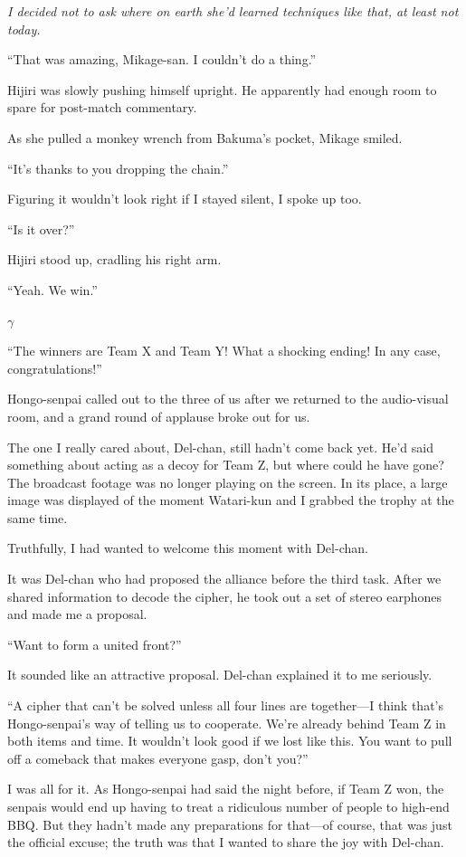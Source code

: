 \documentclass[
    a4paper,
    12pt,
    twoside,
    openany,
    UTF8,
    fontset=windows
]{ctexbook}
\begin{document}
\textit{I decided not to ask where on earth she'd learned techniques like that, at least not today.}

``That was amazing, Mikage-san. I couldn't do a thing.''

Hijiri was slowly pushing himself upright. He apparently had enough room to spare for post-match commentary.

As she pulled a monkey wrench from Bakuma's pocket, Mikage smiled.

``It's thanks to you dropping the chain.''

Figuring it wouldn't look right if I stayed silent, I spoke up too.

``Is it over?''

Hijiri stood up, cradling his right arm.

``Yeah. We win.''

$\gamma$

``The winners are Team X and Team Y! What a shocking ending! In any case, congratulations!''

Hongo-senpai called out to the three of us after we returned to the audio-visual room, and a grand round of applause broke out for us.

The one I really cared about, Del-chan, still hadn't come back yet. He'd said something about acting as a decoy for Team Z, but where could he have gone? The broadcast footage was no longer playing on the screen. In its place, a large image was displayed of the moment Watari-kun and I grabbed the trophy at the same time.

Truthfully, I had wanted to welcome this moment with Del-chan.

It was Del-chan who had proposed the alliance before the third task. After we shared information to decode the cipher, he took out a set of stereo earphones and made me a proposal.

``Want to form a united front?''

It sounded like an attractive proposal. Del-chan explained it to me seriously.

``A cipher that can't be solved unless all four lines are together---I think that's Hongo-senpai's way of telling us to cooperate. We're already behind Team Z in both items and time. It wouldn't look good if we lost like this. You want to pull off a comeback that makes everyone gasp, don't you?''

I was all for it. As Hongo-senpai had said the night before, if Team Z won, the senpais would end up having to treat a ridiculous number of people to high-end BBQ. But they hadn't made any preparations for that---of course, that was just the official excuse; the truth was that I wanted to share the joy with Del-chan.
\end{document}

